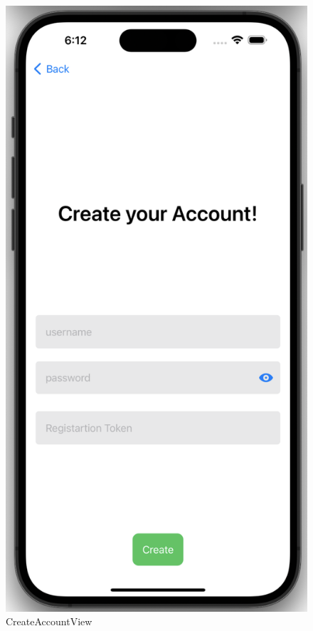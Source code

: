     \begin{figure}[h]
        \includegraphics[scale=0.5]{accountcreate}
        \centering
        \caption{CreateAccountView}\label{fig:createaccountview}
    \end{figure}

